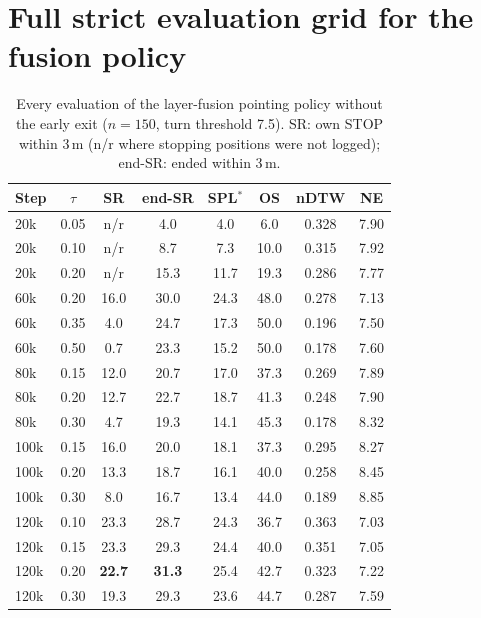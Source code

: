 \documentclass[11pt]{article}
\begin{document}
\section{Full strict evaluation grid for the fusion policy}
\begin{table}[H]
\centering\small
\caption{Every evaluation of the layer-fusion pointing policy without the early exit ($n{=}150$, turn threshold 7.5\textdegree). SR: own STOP within 3\,m (n/r where stopping positions were not logged); end-SR: ended within 3\,m.}
\begin{tabular}{lccccccc}
\toprule
Step & $\tau$ & SR & end-SR & SPL$^*$ & OS & nDTW & NE \\
\midrule
20k & 0.05 & n/r & 4.0 & 4.0 & 6.0 & 0.328 & 7.90 \\
20k & 0.10 & n/r & 8.7 & 7.3 & 10.0 & 0.315 & 7.92 \\
20k & 0.20 & n/r & 15.3 & 11.7 & 19.3 & 0.286 & 7.77 \\
\midrule
60k & 0.20 & 16.0 & 30.0 & 24.3 & 48.0 & 0.278 & 7.13 \\
60k & 0.35 & 4.0 & 24.7 & 17.3 & 50.0 & 0.196 & 7.50 \\
60k & 0.50 & 0.7 & 23.3 & 15.2 & 50.0 & 0.178 & 7.60 \\
\midrule
80k & 0.15 & 12.0 & 20.7 & 17.0 & 37.3 & 0.269 & 7.89 \\
80k & 0.20 & 12.7 & 22.7 & 18.7 & 41.3 & 0.248 & 7.90 \\
80k & 0.30 & 4.7 & 19.3 & 14.1 & 45.3 & 0.178 & 8.32 \\
\midrule
100k & 0.15 & 16.0 & 20.0 & 18.1 & 37.3 & 0.295 & 8.27 \\
100k & 0.20 & 13.3 & 18.7 & 16.1 & 40.0 & 0.258 & 8.45 \\
100k & 0.30 & 8.0 & 16.7 & 13.4 & 44.0 & 0.189 & 8.85 \\
\midrule
120k & 0.10 & 23.3 & 28.7 & 24.3 & 36.7 & 0.363 & 7.03 \\
120k & 0.15 & 23.3 & 29.3 & 24.4 & 40.0 & 0.351 & 7.05 \\
120k & 0.20 & \textbf{22.7} & \textbf{31.3} & 25.4 & 42.7 & 0.323 & 7.22 \\
120k & 0.30 & 19.3 & 29.3 & 23.6 & 44.7 & 0.287 & 7.59 \\
\bottomrule
\end{tabular}
\end{table}
\end{document}
